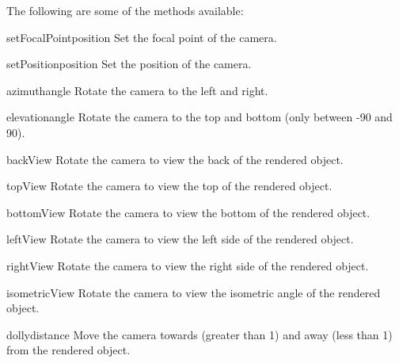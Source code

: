 The following are some of the methods available:
\begin{methoddesc}[Camera]{setFocalPoint}{position}
Set the focal point of the camera.
\end{methoddesc}

\begin{methoddesc}[Camera]{setPosition}{position}
Set the position of the camera.
\end{methoddesc}

\begin{methoddesc}[Camera]{azimuth}{angle}
Rotate the camera to the left and right.
\end{methoddesc}

\begin{methoddesc}[Camera]{elevation}{angle}
Rotate the camera to the top and bottom (only between -90 and 90).
\end{methoddesc}

\begin{methoddesc}[Camera]{backView}{}
Rotate the camera to view the back of the rendered object.
\end{methoddesc}

\begin{methoddesc}[Camera]{topView}{}
Rotate the camera to view the top of the rendered object.
\end{methoddesc}

\begin{methoddesc}[Camera]{bottomView}{}
Rotate the camera to view the bottom of the rendered object.
\end{methoddesc}

\begin{methoddesc}[Camera]{leftView}{}
Rotate the camera to view the left side of the rendered object.
\end{methoddesc}

\begin{methoddesc}[Camera]{rightView}{}
Rotate the camera to view the right side of the rendered object.
\end{methoddesc}

\begin{methoddesc}[Camera]{isometricView}{}
Rotate the camera to view the isometric angle of the rendered object.
\end{methoddesc}

\begin{methoddesc}[Camera]{dolly}{distance}
Move the camera towards (greater than 1) and away (less than 1) from
the rendered object.
\end{methoddesc}

